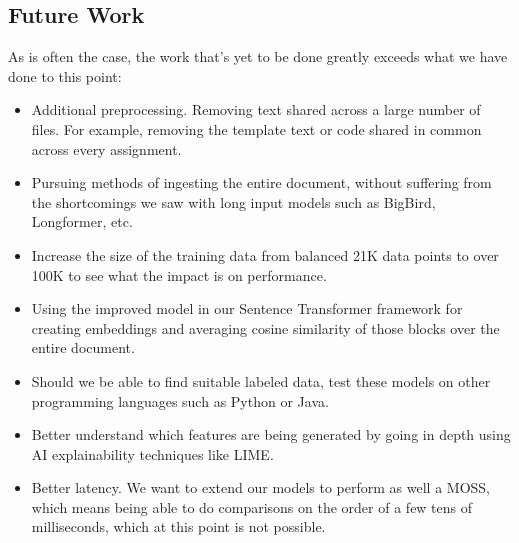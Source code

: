 \documentclass[twocolumn]{article}
\begin{document}
\subsection{\normalsize Future Work}
As is often the case, the work that's yet to be done greatly exceeds what we have done to this point:
\begin{itemize}
  \item Additional preprocessing. Removing text shared across a large number of files. For example, removing the template text or code shared in common across every assignment. 
  \item Pursuing methods of ingesting the entire document, without suffering from the shortcomings we saw with long input models such as BigBird, Longformer, etc. 
  \item Increase the size of the training data from balanced 21K data points to over 100K to see what the impact is on performance.
  \item Using the improved model in our Sentence Transformer framework for creating embeddings and averaging cosine similarity of those blocks over the entire document.
  \item Should we be able to find suitable labeled data, test these models on other programming languages such as Python or Java. 
  \item Better understand which features are being generated by going in depth using AI explainability techniques like LIME.
  \item Better latency. We want to extend our models to perform as well a MOSS, which means being able to do comparisons on the order of a few tens of milliseconds, which at this point is not possible.


\end{itemize}

\end{document}
